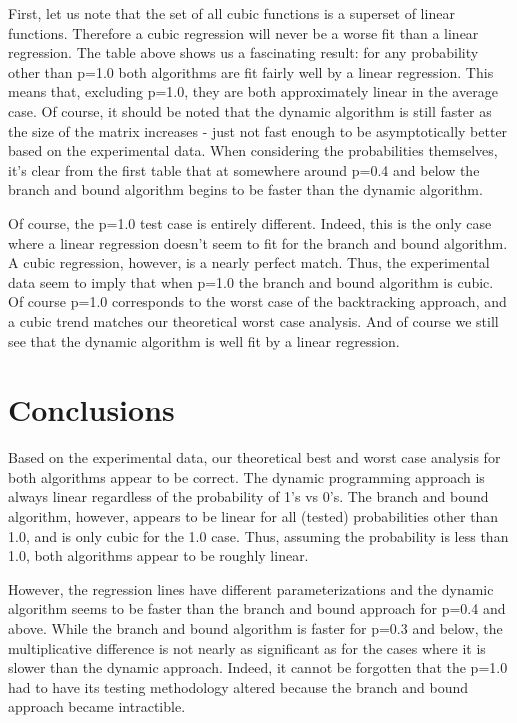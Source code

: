 \documentclass{article}
\begin{document}
First, let us note that the set of all cubic functions is a superset of linear functions.
Therefore a cubic regression will never be a worse fit than a linear regression.
The table above shows us a fascinating result: for any probability other than p=1.0 both algorithms are fit fairly well by a linear regression.
This means that, excluding p=1.0, they are both approximately linear in the average case.
Of course, it should be noted that the dynamic algorithm is still faster as the size of the matrix increases - just not fast enough to be asymptotically better based on the experimental data.
When considering the probabilities themselves, it's clear from the first table that at somewhere around p=0.4 and below the branch and bound algorithm begins to be faster than the dynamic algorithm.

Of course, the p=1.0 test case is entirely different.
Indeed, this is the only case where a linear regression doesn't seem to fit for the branch and bound algorithm.
A cubic regression, however, is a nearly perfect match.
Thus, the experimental data seem to imply that when p=1.0 the branch and bound algorithm is cubic.
Of course p=1.0 corresponds to the worst case of the backtracking approach, and a cubic trend matches our theoretical worst case analysis.
And of course we still see that the dynamic algorithm is well fit by a linear regression.

\pagebreak
\section{Conclusions}

Based on the experimental data, our theoretical best and worst case analysis for both algorithms appear to be correct.
The dynamic programming approach is always linear regardless of the probability of 1's vs 0's.
The branch and bound algorithm, however, appears to be linear for all (tested) probabilities other than 1.0, and is only cubic for the 1.0 case.
Thus, assuming the probability is less than 1.0, both algorithms appear to be roughly linear.

However, the regression lines have different parameterizations and the dynamic algorithm seems to be faster than the branch and bound approach for p=0.4 and above.
While the branch and bound algorithm is faster for p=0.3 and below, the multiplicative difference is not nearly as significant as for the cases where it is slower than the dynamic approach.
Indeed, it cannot be forgotten that the p=1.0 had to have its testing methodology altered because the branch and bound approach became intractible.
\end{document}
